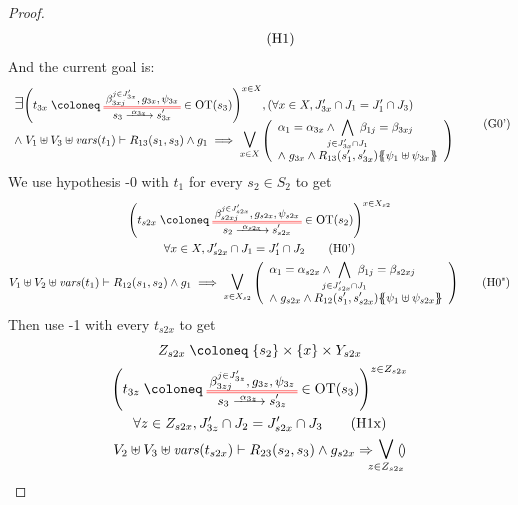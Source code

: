 \documentclass{article}
\begin{document}
\begin{proof}
\begin{gather}
\begin{array}{l}
{\begin{array}{l}
		\end{array}}
		\end{array} \hyp{1}
	\end{gather}
	And the current goal is:
	\[
		\everymath{\displaystyle}\begin{array}{l}
		\bigsymb{\exists} \mpar{t_{3x} \defobject \OTx{3}{x}{3x}{3x} \in \fOT{s_3}}^{x \in X}, \mpar{\forall x \in X, J'_{3x} \cap J_1 = J'_1 \cap J_3} \\[-4pt]
		\nwedge V_1 \uplus V_3 \uplus \fvars{t_1} \vdash R_{13}\mpar{s_1, s_3} \wedge g_1 \implies \operatorname*{\bigsymb{\bigvee}}_{x \in X} \mpar{\begin{array}{l}
			\alpha_1 = \alpha_{3x} \wedge \bigwedge_\subbox{j \in J'_{3x} \cap J_1} \beta_{1j} = \beta_{3xj} \\[12pt]
			\nwedge g_{3x} \wedge R_{13}\mpar{s'_1, s'_{3x}}\psubst{\psi_1 \uplus \psi_{3x}}
		\end{array}}
		\end{array} \goal{0'}
	\]
	We use hypothesis \hyp{0} with \(t_1\) for every \(s_2 \in S_2\) to get
	\begin{gather*}
		\mpar{t_{s2x} \defobject \OT{s_2}{s'_{s2x}}{\alpha_{s2x}}{\beta_{s2xj}^{j \in J'_{s2x}}}{g_{s2x}}{\psi_{s2x}} \in \fOT{s_2}}^{x \in X_{s2}} \\
		\forall x \in X, J'_{s2x} \cap J_1 = J'_1 \cap J_2 \hyp{0'} \\
		V_1 \uplus V_2 \uplus \fvars{t_1} \vdash R_{12}\mpar{s_1, s_2} \wedge g_1 \implies \operatorname*{\bigsymb{\bigvee}}_{x \in X_{s2}} \mpar{\everymath{\displaystyle}\begin{array}{l}
			\alpha_1 = \alpha_{s2x} \wedge \bigwedge_\subbox{j \in J'_{s2x} \cap J_1} \beta_{1j} = \beta_{s2xj} \\[12pt]
			\nwedge g_{s2x} \wedge R_{12}\mpar{s'_1, s'_{s2x}}\psubst{\psi_1 \uplus \psi_{s2x}}
		\end{array}} \hyp{0"}
	\end{gather*}
	Then use \hyp{1} with every \(t_{s2x}\) to get
	\begin{gather*}
		Z_{s2x} \defobject \mbrc{s_2} \times \mbrc{x} \times Y_{s2x} \\
		\mpar{t_{3z} \defobject \OTx{3}{z}{3z}{3z} \in \fOT{s_3}}^{z \in Z_{s2x}} \\
		\forall z \in Z_{s2x}, J'_{3z} \cap J_2 = J'_{s2x} \cap J_3 \hyp{1x} \\
		V_2 \uplus V_3 \uplus \fvars{t_{s2x}} \vdash R_{23}\mpar{s_2, s_3} \wedge g_{s2x} \Rightarrow \operatorname*{\bigsymb{\bigvee}}_\subbox{z \in Z_{s2x}} \mpar{\!\everymath{\displaystyle}\begin{array}{l}

\end{array}}
\end{gather*}
\end{proof}
\end{document}
